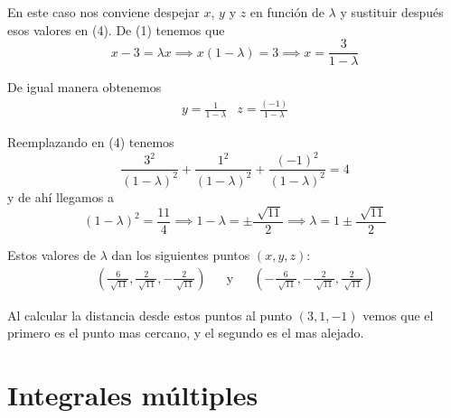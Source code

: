 \documentclass[12pt]{article}
\begin{document}
En este caso nos conviene despejar $ x $, $ y $ y $ z  $ en función de $ \lambda $ y sustituir después esos valores en (4). De (1) tenemos que 
\[
  x-3=\lambda x  \implies x(1-\lambda)=3  \implies x=\frac{3}{1-\lambda}
\]

De igual manera obtenemos
\begin{align*}
  y = \frac{1}{1-\lambda} & z = \frac{(-1)}{1-\lambda}
\end{align*}

Reemplazando en (4) tenemos
\[
  \frac{3^2}{(1-\lambda)^2}+\frac{1^2}{(1-\lambda)^2}+\frac{(-1)^2}{(1-\lambda)^2}=4
\]
y de ahí llegamos a
\[
	(1-\lambda)^2=\frac{11}{4}  \implies 1-\lambda=\pm \frac{\sqrt[]{11}}{2}  \implies \lambda = 1 \pm \frac{\sqrt[]{11}}{2}
\]

Estos valores de $ \lambda $ dan los siguientes puntos $ (x,y,z) $:
\begin{align*}
	\left(\frac{6}{\sqrt[]{11}},\frac{2}{\sqrt[]{11}},-\frac{2}{\sqrt[]{11}}\right) && \text{y} && \left(-\frac{6}{\sqrt[]{11}},-\frac{2}{\sqrt[]{11}},\frac{2}{\sqrt[]{11}}\right)
\end{align*}

Al calcular la distancia desde estos puntos al punto $ (3,1,-1) $ vemos que el primero es el punto mas cercano, y el segundo es el mas alejado.

\begin{center}
\end{center}


\newpage
\section{Integrales múltiples}



\newpage
{}
\printbibliography
\end{document}
